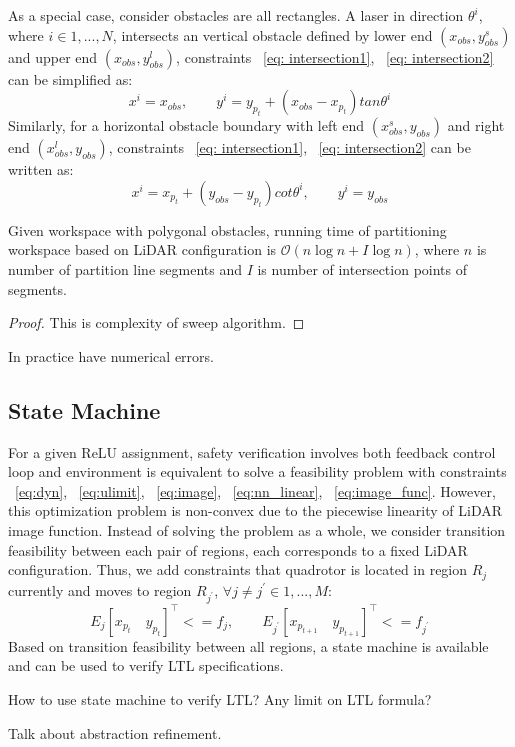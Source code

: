 As a special case, consider obstacles are all rectangles. 
A laser in direction $\theta^i$, where $i \in {1, ..., N}$, intersects an vertical obstacle 
defined by lower end $(x_{obs}, y_{obs}^s)$ and upper end $(x_{obs}, y_{obs}^l)$, 
constraints ~\eqref{eq: intersection1}, ~\eqref{eq: intersection2} can be simplified as:
\begin{equation}
    \label{eq:vertical}
    x^i = x_{obs}, \qquad y^i = y_{p_t} + (x_{obs} - x_{p_t}) tan \theta^i
\end{equation}
Similarly, for a horizontal obstacle boundary with left end $(x_{obs}^s, y_{obs})$ and right end $(x_{obs}^l, y_{obs})$,
constraints ~\eqref{eq: intersection1}, ~\eqref{eq: intersection2} can be written as:
\begin{equation} 
    \label{eq:horizontal}
    x^i = x_{p_t} + (y_{obs} - y_{p_t}) cot \theta^i, \qquad y^i = y_{obs}
\end{equation}


\begin{theorem}
    Given workspace with polygonal obstacles, running time of partitioning workspace based on LiDAR configuration is
    $\mathcal{O}(n\log{}n + I\log{}n)$, where $n$ is number of partition line segments 
    and $I$ is number of intersection points of segments.
    \begin{proof}
        {\color{blue} This is complexity of sweep algorithm.} 
    \end{proof}
\end{theorem}    

{\color{blue} In practice have numerical errors.}



\subsection{State Machine}


For a given ReLU assignment, safety verification involves both feedback control loop and environment 
is equivalent to solve a feasibility problem with constraints 
~\eqref{eq:dyn}, ~\eqref{eq:ulimit}, ~\eqref{eq:image}, ~\eqref{eq:nn_linear}, ~\eqref{eq:image_func}.
However, this optimization problem is non-convex due to the piecewise linearity of LiDAR image function.
Instead of solving the problem as a whole, we consider transition feasibility between 
each pair of regions, each corresponds to a fixed LiDAR configuration. 
Thus, we add constraints that quadrotor is located in region $R_j$ currently and moves to region $R_{j^\prime}$,
$\forall j \neq j^\prime \in {1, ..., M}$:
\begin{equation}
    \label{eq:region}
    E_j[x_{p_t} \quad y_{p_t}]^\intercal <= f_j, \qquad E_{j^\prime}[x_{p_{t+1}} \quad y_{p_{t+1}}]^\intercal <= f_{j^\prime}
\end{equation}
Based on transition feasibility between all regions, a state machine is available and can be used to verify
LTL specifications.

{\color{blue} How to use state machine to verify LTL?}
{\color{blue} Any limit on LTL formula?}

{\color{blue} Talk about abstraction refinement.}

